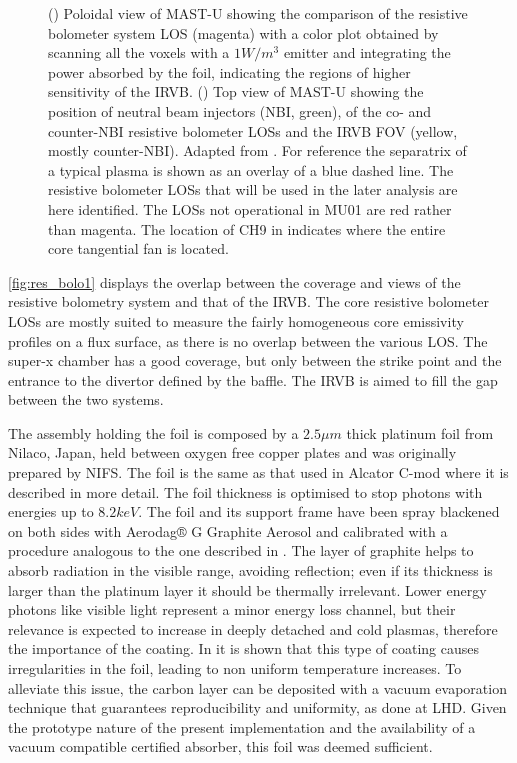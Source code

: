 \begin{figure}
\begin{subfigure}{0.48\linewidth}
         \caption{}
         \label{fig:res_bolo1b}
     \end{subfigure}
	\caption{() Poloidal view of MAST-U showing the comparison of the resistive bolometer system LOS (magenta) with a color plot obtained by scanning all the voxels with a $1W/m^3$ emitter and integrating the power absorbed by the foil, indicating the regions of higher sensitivity of the IRVB. () Top view of MAST-U showing the position of neutral beam injectors (NBI, green), of the co- and counter-NBI resistive bolometer LOSs and the IRVB FOV (yellow, mostly counter-NBI). Adapted from \cite{Rivero-Rodriguez2018}. For reference the separatrix of a typical plasma is shown as an overlay of a blue dashed line. The resistive bolometer LOSs that will be used in the later analysis are here identified. The LOSs not operational in MU01 are red rather than magenta. The location of CH9 in  indicates where the entire core tangential fan is located.}
    \label{fig:res_bolo1}
\end{figure}


\autoref{fig:res_bolo1} displays the overlap between the coverage and views of the resistive bolometry system and that of the IRVB. The core resistive bolometer LOSs are mostly suited to measure the fairly homogeneous core emissivity profiles on a flux surface, as there is no overlap between the various LOS. The super-x chamber has a good coverage, but only between the  strike point and the entrance to the divertor defined by the baffle. The IRVB is aimed to fill the gap between the two systems.

The assembly holding the foil is composed by a $2.5\mu m$ thick platinum foil from Nilaco, Japan, held between oxygen free copper plates and was originally prepared by NIFS. The foil is the same as that used in Alcator C-mod\cite{Reinke2018a} where it is described in more detail. The foil thickness is optimised to stop photons with energies up to $8.2keV$. \cite{PETERSON2010,Gullikson2022} The foil and its support frame have been spray blackened on both sides with Aerodag® G Graphite Aerosol and calibrated with a procedure analogous to the one described in \cite{Itomi2014}. The layer of graphite helps to absorb radiation in the visible range, avoiding reflection; even if its thickness is larger than the platinum layer\cite{Pandya2014} it should be thermally irrelevant. \cite{VanEden2018} Lower energy photons like visible light represent a minor energy loss channel, but their relevance is expected to increase in deeply detached and cold plasmas, therefore the importance of the coating.\cite{Havlickova2015a} In \cite{Mukai2016} it is shown that this type of coating causes irregularities in the foil, leading to non uniform temperature increases. To alleviate this issue, the carbon layer can be deposited with a vacuum evaporation technique that guarantees reproducibility and uniformity, as done at LHD. \cite{Mukai2016} Given the prototype nature of the present implementation and the availability of a vacuum compatible certified absorber, this foil was deemed sufficient.

